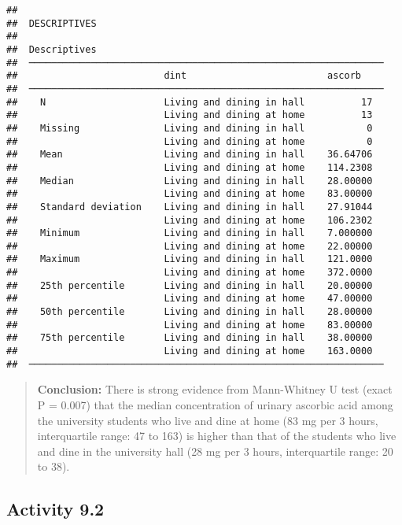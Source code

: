 \documentclass[
]{memoir}
\begin{document}
\begin{verbatim}
## 
##  DESCRIPTIVES
## 
##  Descriptives                                                    
##  ─────────────────────────────────────────────────────────────── 
##                          dint                         ascorb     
##  ─────────────────────────────────────────────────────────────── 
##    N                     Living and dining in hall          17   
##                          Living and dining at home          13   
##    Missing               Living and dining in hall           0   
##                          Living and dining at home           0   
##    Mean                  Living and dining in hall    36.64706   
##                          Living and dining at home    114.2308   
##    Median                Living and dining in hall    28.00000   
##                          Living and dining at home    83.00000   
##    Standard deviation    Living and dining in hall    27.91044   
##                          Living and dining at home    106.2302   
##    Minimum               Living and dining in hall    7.000000   
##                          Living and dining at home    22.00000   
##    Maximum               Living and dining in hall    121.0000   
##                          Living and dining at home    372.0000   
##    25th percentile       Living and dining in hall    20.00000   
##                          Living and dining at home    47.00000   
##    50th percentile       Living and dining in hall    28.00000   
##                          Living and dining at home    83.00000   
##    75th percentile       Living and dining in hall    38.00000   
##                          Living and dining at home    163.0000   
##  ───────────────────────────────────────────────────────────────
\end{verbatim}

\begin{quote}
\textbf{Conclusion:} There is strong evidence from Mann-Whitney U test (exact P = 0.007) that the median concentration of urinary ascorbic acid among the university students who live and dine at home (83 mg per 3 hours, interquartile range: 47 to 163) is higher than that of the students who live and dine in the university hall (28 mg per 3 hours, interquartile range: 20 to 38).
\end{quote}

\hypertarget{activity-9.2}{%
\subsection*{Activity 9.2}\label{activity-9.2}}
\end{document}
